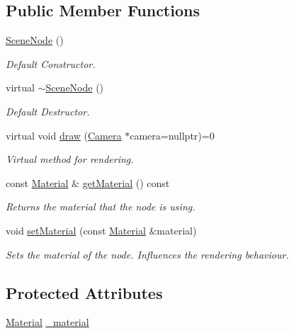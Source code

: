 \subsection*{Public Member Functions}
\begin{DoxyCompactItemize}
\item 
\hyperlink{classburn_1_1_scene_node_a107d42062677132d1104391fd2bf2530}{Scene\-Node} ()
\begin{DoxyCompactList}\small\item\em Default Constructor. \end{DoxyCompactList}\item 
virtual \hyperlink{classburn_1_1_scene_node_aa651409167ec065930115c8b31057e35}{$\sim$\-Scene\-Node} ()
\begin{DoxyCompactList}\small\item\em Default Destructor. \end{DoxyCompactList}\item 
virtual void \hyperlink{classburn_1_1_scene_node_adcea597571e59f15421c7a9ae0bfdbc3}{draw} (\hyperlink{classburn_1_1_camera}{Camera} $\ast$camera=nullptr)=0
\begin{DoxyCompactList}\small\item\em Virtual method for rendering. \end{DoxyCompactList}\item 
const \hyperlink{classburn_1_1_material}{Material} \& \hyperlink{classburn_1_1_scene_node_a90bbe26a50c9039986bb60b52fd82a7d}{get\-Material} () const 
\begin{DoxyCompactList}\small\item\em Returns the material that the node is using. \end{DoxyCompactList}\item 
void \hyperlink{classburn_1_1_scene_node_a66ab4afa17f078a3814d4bbd88ed9ea1}{set\-Material} (const \hyperlink{classburn_1_1_material}{Material} \&material)
\begin{DoxyCompactList}\small\item\em Sets the material of the node. Influences the rendering behaviour. \end{DoxyCompactList}\end{DoxyCompactItemize}
\subsection*{Protected Attributes}
\begin{DoxyCompactItemize}
\item 
\hyperlink{classburn_1_1_material}{Material} \hyperlink{classburn_1_1_scene_node_a8474c310dafc48e860ebb5ed7ecc7f8f}{\-\_\-material}
\end{DoxyCompactItemize}


